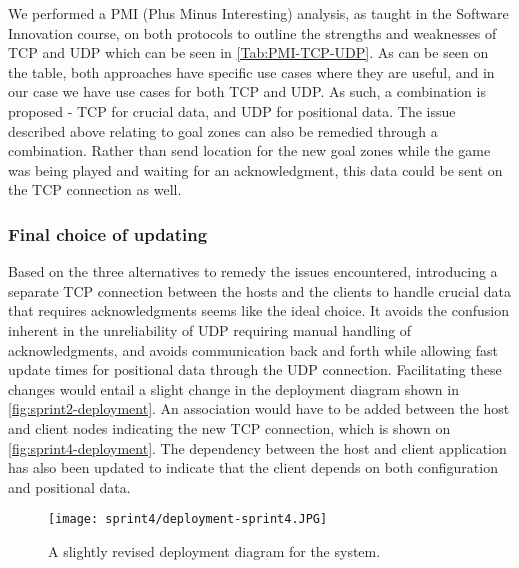 We performed a PMI (Plus Minus Interesting) analysis, as taught in the Software Innovation course, on both protocols to outline the strengths and weaknesses of TCP and UDP which can be seen in \autoref{Tab:PMI-TCP-UDP}.
As can be seen on the table, both approaches have specific use cases where they are useful, and in our case we have use cases for both TCP and UDP.
As such, a combination is proposed - TCP for crucial data, and UDP for positional data.
The issue described above relating to goal zones can also be remedied through a combination.
Rather than send location for the new goal zones while the game was being played and waiting for an acknowledgment, this data could be sent on the TCP connection as well.

\subsubsection{Final choice of updating}
Based on the three alternatives to remedy the issues encountered, introducing a separate TCP connection between the hosts and the clients to handle crucial data that requires acknowledgments seems like the ideal choice.
It avoids the confusion inherent in the unreliability of UDP requiring manual handling of acknowledgments, and avoids communication back and forth while allowing fast update times for positional data through the UDP connection.
Facilitating these changes would entail a slight change in the deployment diagram shown in \autoref{fig:sprint2-deployment}.
An association would have to be added between the host and client nodes indicating the new TCP connection, which is shown on \autoref{fig:sprint4-deployment}.
The dependency between the host and client application has also been updated to indicate that the client depends on both configuration and positional data.
\begin{figure}[H]
    \centering
    \texttt{[image: sprint4/deployment-sprint4.JPG]}
    \caption{A slightly revised deployment diagram for the system.}
    \label{fig:sprint4-deployment}
\end{figure}
\noindent
